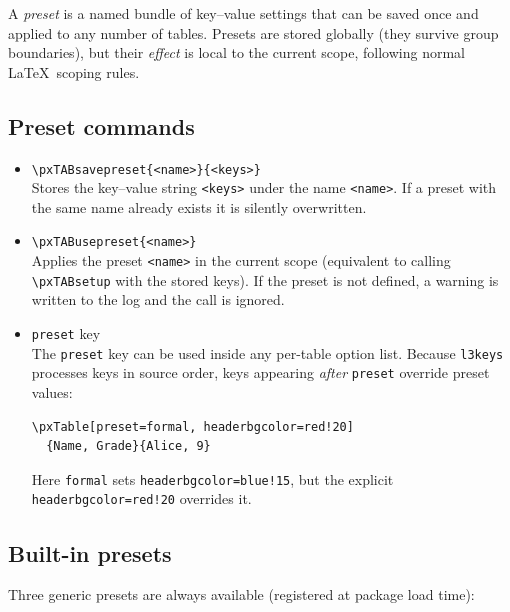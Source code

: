 \documentclass[11pt,a4paper]{article}
\begin{document}
A \emph{preset} is a named bundle of key--value settings that can be
saved once and applied to any number of tables.  Presets are stored
globally (they survive group boundaries), but their \emph{effect} is
local to the current scope, following normal \LaTeX\ scoping rules.

\subsection{Preset commands}

\begin{itemize}
  \item \verb|\pxTABsavepreset{<name>}{<keys>}|\\
    Stores the key--value string \verb|<keys>| under the name
    \verb|<name>|.  If a preset with the same name already exists it is
    silently overwritten.

  \item \verb|\pxTABusepreset{<name>}|\\
    Applies the preset \verb|<name>| in the current scope (equivalent
    to calling \verb|\pxTABsetup| with the stored keys).  If the preset
    is not defined, a warning is written to the log and the call is
    ignored.

  \item \texttt{preset} key\\
    The \texttt{preset} key can be used inside any per-table option
    list.  Because \texttt{l3keys} processes keys in source order, keys
    appearing \emph{after} \texttt{preset} override preset values:

\begin{verbatim}
\pxTable[preset=formal, headerbgcolor=red!20]
  {Name, Grade}{Alice, 9}
\end{verbatim}

    Here \texttt{formal} sets \texttt{headerbgcolor=blue!15}, but the
    explicit \texttt{headerbgcolor=red!20} overrides it.
\end{itemize}

\subsection{Built-in presets}

Three generic presets are always available (registered at package load
time):
\end{document}
